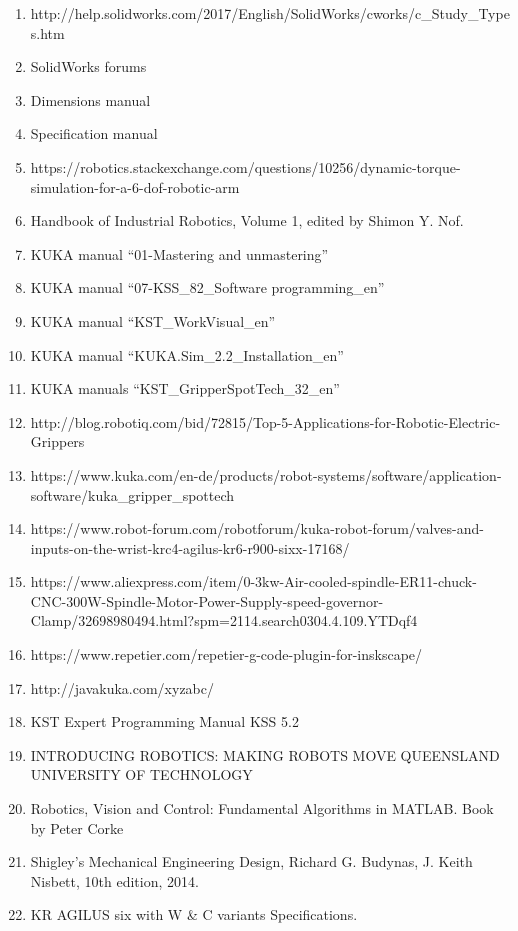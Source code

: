\documentclass{book}
\begin{document}
\begin{enumerate}
	\item http://help.solidworks.com/2017/English/SolidWorks/cworks/c\_Study\_Types.htm 
	\item SolidWorks forums
	\item Dimensions manual 
	\item Specification manual
	\item https://robotics.stackexchange.com/questions/10256/dynamic-torque-simulation-for-a-6-dof-robotic-arm
	\item Handbook of Industrial Robotics, Volume 1, edited by Shimon Y. Nof. 
	\item KUKA manual “01-Mastering and unmastering”
	\item KUKA manual “07-KSS\_82\_Software programming\_en”
	\item KUKA manual “KST\_WorkVisual\_en”
	\item KUKA manual “KUKA.Sim\_2.2\_Installation\_en”
	\item KUKA manuals “KST\_GripperSpotTech\_32\_en”
	\item http://blog.robotiq.com/bid/72815/Top-5-Applications-for-Robotic-Electric-Grippers 
	\item https://www.kuka.com/en-de/products/robot-systems/software/application-software/kuka\_gripper\_spottech 
	\item https://www.robot-forum.com/robotforum/kuka-robot-forum/valves-and-inputs-on-the-wrist-krc4-agilus-kr6-r900-sixx-17168/ 
\item https://www.aliexpress.com/item/0-3kw-Air-cooled-spindle-ER11-chuck-CNC-300W-Spindle-Motor-Power-Supply-speed-governor-Clamp/32698980494.html?spm=2114.search0304.4.109.YTDqf4 
	\item https://www.repetier.com/repetier-g-code-plugin-for-inskscape/
	\item http://javakuka.com/xyzabc/
	\item KST Expert Programming Manual KSS 5.2
	\item INTRODUCING ROBOTICS: MAKING ROBOTS MOVE QUEENSLAND UNIVERSITY OF TECHNOLOGY
	\item Robotics, Vision and Control: Fundamental Algorithms in MATLAB. Book by Peter Corke
	\item Shigley’s Mechanical Engineering Design, Richard G. Budynas, J. Keith Nisbett, 10th edition, 2014.
	\item KR AGILUS six with W \& C variants Specifications.
	 

\end{enumerate}
\end{document}
